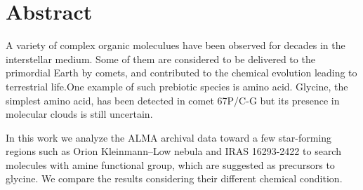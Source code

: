\chapter*{Abstract}

\singlespacing
\doublespacing

A variety of complex organic moleculues have been observed for decades in the interstellar medium. Some of them are considered to be delivered to the primordial Earth by comets, and contributed to the chemical evolution leading to terrestrial life.One example of such prebiotic species is amino acid. Glycine, the simplest amino acid, has been detected in comet 67P/C-G but its presence in molecular clouds is still uncertain.

In this work we analyze the ALMA archival data toward a few star-forming regions such as Orion Kleinmann–Low nebula and IRAS 16293-2422 to search molecules with amine functional group, which are suggested as precursors to glycine. We compare the results considering their different chemical condition.

